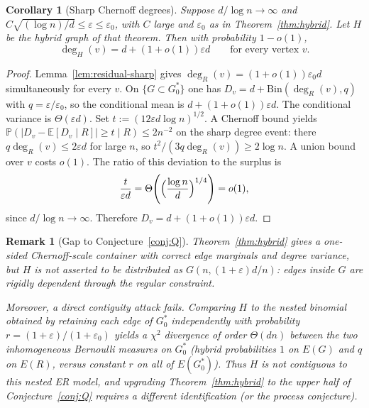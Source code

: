 \documentclass[11pt]{article}
\newtheorem{corollary}[theorem]{Corollary}
\newtheorem{remark}[theorem]{Remark}
\newcommand{\EE}{\mathbb{E}}
\newcommand{\PP}{\mathbb{P}}
\begin{document}
\begin{corollary}[Sharp Chernoff degrees]
\label{cor:hybrid-sharp}
Suppose \(d/\log n\to\infty\) and \(C\sqrt{(\log n)/d}\le\varepsilon\le\varepsilon_0\), with
\(C\) large and \(\varepsilon_0\) as in Theorem~\ref{thm:hybrid}.
Let \(H\) be the hybrid graph of that theorem. Then with probability \(1-o(1)\),
\[
\deg_H(v)=d+(1+o(1))\varepsilon d
\qquad\text{for every vertex \(v\).}
\]
\end{corollary}

\begin{proof}
Lemma~\ref{lem:residual-sharp} gives \(\deg_R(v)=(1+o(1))\varepsilon_0 d\) simultaneously
for every \(v\). On \(\{G\subset G^*_0\}\) one has
\(D_v=d+\mathrm{Bin}(\deg_R(v),q)\) with \(q=\varepsilon/\varepsilon_0\), so the conditional mean is
\(d+(1+o(1))\varepsilon d\).
The conditional variance is \(\Theta(\varepsilon d)\). Set
\(t:=(12\varepsilon d\log n)^{1/2}\).
A Chernoff bound yields
\(\PP(|D_v-\EE[D_v\mid R]|\ge t\mid R)\le 2n^{-2}\) on the sharp degree event:
there \(q\deg_R(v)\le 2\varepsilon d\) for large \(n\), so
\(t^2/(3q\deg_R(v))\ge 2\log n\).
A union bound over \(v\) costs \(o(1)\).
The ratio of this deviation to the surplus is
\[
\frac{t}{\varepsilon d}
=\Theta\Biggl(\Bigl(\frac{\log n}{d}\Bigr)^{1/4}\Biggr)=o(1),
\]
since \(d/\log n\to\infty\). Therefore \(D_v=d+(1+o(1))\varepsilon d\).
\end{proof}

\begin{remark}[Gap to Conjecture~\ref{conj:Q}]
\label{rem:hybrid-gap}
Theorem~\ref{thm:hybrid} gives a one-sided Chernoff-scale container with correct edge
marginals and degree variance, but \(H\) is not asserted to be distributed as
\(G(n,(1+\varepsilon)d/n)\): edges inside \(G\) are rigidly dependent through the regular
constraint.

Moreover, a direct contiguity attack fails. Comparing \(H\) to the nested binomial
obtained by retaining each edge of \(G^*_0\) independently with probability
\(r=(1+\varepsilon)/(1+\varepsilon_0)\) yields a \(\chi^2\) divergence of order
\(\Theta(dn)\) between the two inhomogeneous Bernoulli measures on \(G^*_0\)
(hybrid probabilities \(1\) on \(E(G)\) and \(q\) on \(E(R)\), versus constant \(r\) on all of
\(E(G^*_0)\)). Thus \(H\) is not contiguous to this nested ER model, and upgrading
Theorem~\ref{thm:hybrid} to the upper half of Conjecture~\ref{conj:Q} requires a
different identification (or the process conjecture).
\end{remark}
\end{document}
